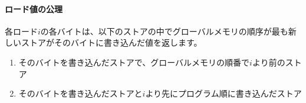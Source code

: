 \begin{comment}
\newcommand{\loadvalueaxiom}{
  Each byte of each load $i$ returns the value written to that byte by the store that is the latest in global memory order among the following stores:
  \begin{enumerate}
    \item Stores that write that byte and that precede $i$ in the global memory order
    \item Stores that write that byte and that precede $i$ in program order
  \end{enumerate}
}
\end{comment}
\newcommand{\loadvalueaxiom}{
  各ロード$i$の各バイトは、以下のストアの中でグローバルメモリの順序が最も新しいストアがそのバイトに書き込んだ値を返します。
  \begin{enumerate}
    \item そのバイトを書き込んだストアで、グローバルメモリの順番で$i$より前のストア
    \item そのバイトを書き込んだストアと$i$より先にプログラム順に書き込んだストア
  \end{enumerate}
}

\begin{comment}
\newcommand{\atomicityaxiom}{If $r$ and $w$ are paired load and store operations generated by aligned LR and SC instructions in a hart $h$, $s$ is a store to byte $x$, and $r$ returns a value written by $s$, then $s$ must precede $w$ in the global memory order, and there can be no store from a hart other than $h$ to byte $x$ following $s$ and preceding $w$ in the global memory order.}
\end{comment}
\newcommand{\atomicityaxiom}{$r$と$w$がhart$h$内のアラインドLR命令とSC命令によって生成されるペアのロード・ストア演算で、$s$がバイト$x$へのストアで、$r$が$s$によって書き込まれた値を返す場合、グローバルメモリの順序では$s$が$w$に先行しなければならず、$h$以外のハートから、グローバルメモリの順序で$s$に続いて$w$に先行するバイト$x$へのストアはありえません。}

\begin{comment}
\newcommand{\progressaxiom}{No memory operation may be preceded in the global memory order by an infinite sequence of other memory operations.}
\end{comment}
\newcommand{\progressaxiom}{いかなるメモリ操作も、グローバルなメモリ順序において、他のメモリ操作の無限のシーケンスに先行することはできません。}

\paragraph{ロード値の公理}
\label{rvwmo:ax:load}
\loadvalueaxiom

